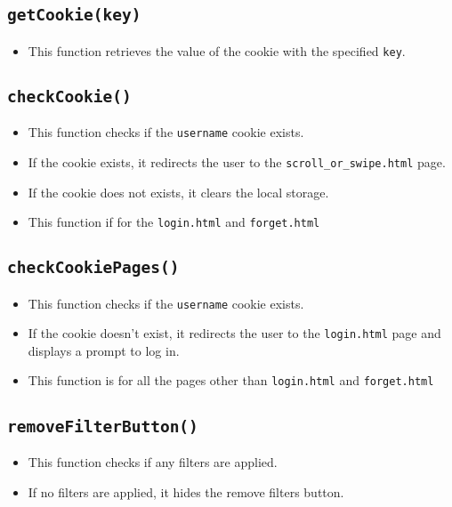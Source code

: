 \documentclass[12pt,a4paper]{article}
\begin{document}
\subsection{\texttt{getCookie(key)}}
\begin{itemize}
    \item This function retrieves the value of the cookie with the specified \texttt{key}.
\end{itemize}

\subsection{\texttt{checkCookie()}}
\begin{itemize}
    \item This function checks if the \texttt{username} cookie exists.
    \item If the cookie exists, it redirects the user to the \texttt{scroll\_or\_swipe.html} page.
    \item If the cookie does not exists, it clears the local storage.
    \item This function if for the \texttt{login.html} and \texttt{forget.html}
\end{itemize}

\subsection{\texttt{checkCookiePages()}}
\begin{itemize}
    \item This function checks if the \texttt{username} cookie exists.
    \item If the cookie doesn't exist, it redirects the user to the \texttt{login.html} page and displays a prompt to log in.
    \item This function is for all the pages other than \texttt{login.html} and \texttt{forget.html}
\end{itemize}


\subsection{\texttt{removeFilterButton()}}
\begin{itemize}
    \item This function checks if any filters are applied.
    \item If no filters are applied, it hides the remove filters button.
\end{itemize}
\end{document}
